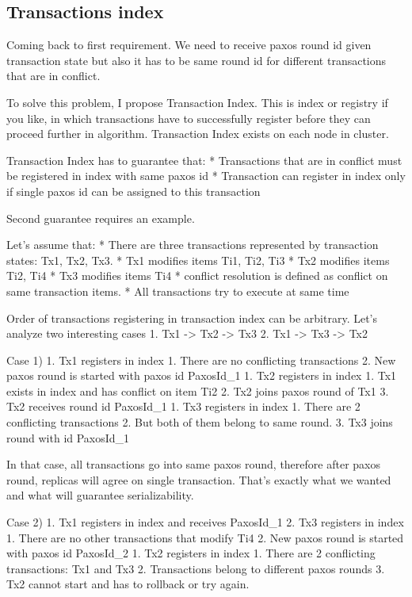 \subsection{Transactions index}


Coming back to first requirement. We need to receive paxos round id given transaction state but also it has to be same round id for different transactions that are in conflict.


To solve this problem, I propose Transaction Index. This is index or registry if you like, in which transactions have to successfully register before they can proceed further in algorithm.        Transaction Index exists on each node in cluster.


Transaction Index has to guarantee that:
* Transactions that are in conflict must be registered in index with same paxos id
* Transaction can register in index only if single paxos id can be assigned to this transaction


Second guarantee requires an example.


Let’s assume that:
* There are three transactions represented by transaction states: Tx1, Tx2, Tx3.
* Tx1 modifies items Ti1, Ti2, Ti3
* Tx2 modifies items Ti2, Ti4
* Tx3 modifies items Ti4
* conflict resolution is defined as conflict on same transaction items.
* All transactions try to execute at same time


Order of transactions registering in transaction index can be arbitrary. Let’s analyze two interesting cases
1. Tx1 -> Tx2 -> Tx3
2. Tx1 -> Tx3 -> Tx2


Case 1)
1. Tx1 registers in index
   1. There are no conflicting transactions
   2. New paxos round is started with paxos id PaxosId_1
1. Tx2 registers in index
   1. Tx1 exists in index and has conflict on item Ti2
   2. Tx2 joins paxos round of Tx1 
   3. Tx2 receives round id PaxosId_1
1. Tx3 registers in index
   1. There are 2 conflicting transactions
   2. But both of them belong to same round. 
   3. Tx3 joins round with id PaxosId_1


In that case, all transactions go into same paxos round, therefore after paxos round, replicas will agree on single transaction. That’s exactly what we wanted and what will guarantee serializability.


Case 2)
1. Tx1 registers in index and receives PaxosId_1
2. Tx3 registers in index
   1. There are no other transactions that modify Ti4
   2. New paxos round is started with paxos id PaxosId_2
1. Tx2 registers in index
   1. There are 2 conflicting transactions: Tx1 and Tx3
   2. Transactions belong to different paxos rounds
   3. Tx2 cannot start and has to rollback or try again.


